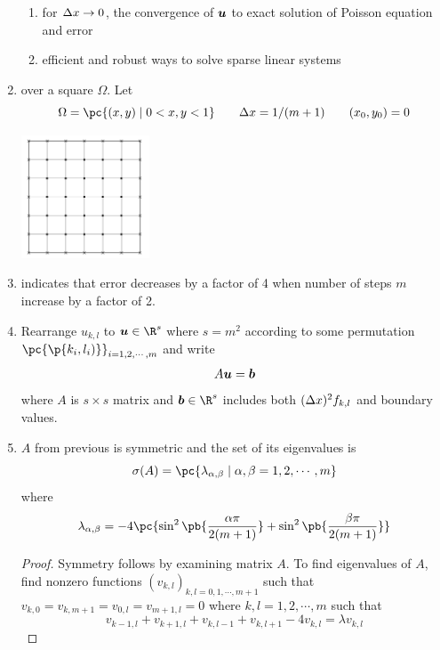 \documentclass[11pt]{article}
\begin{document}
\begin{enumerate}
\begin{enumerate}
        \item for $\Delta x \to 0$, the convergence of $\bm{u}$ to exact solution of Poisson equation and error
        \item efficient and robust ways to solve sparse linear systems
    \end{enumerate}
    \item {} over a square $\Omega$. Let 
    \[
        \Omega = \pc{(x,y) \mid 0 < x,y < 1}    
        \quad \quad
        \Dx = 1/(m+1)
        \quad \quad
        (x_0, y_0) = 0
    \]
    \begin{center}
        \includegraphics[width=0.3\textwidth]{simplified_grid}
    \end{center}
    \item {} indicates that error decreases by a factor of 4 when number of steps $m$ increase by a factor of 2.
    \item {} Rearrange $u_{k,l}$ to $\bu \in \R^s$ where $s=m^2$ according to some permutation $\pc{\p{k_i, l_i)}}_{i=1,2,\cdots,m}$ and write 
    \[
        A \bm{u} = \bm{b}    
    \]
    where $A$ is $s\times s$ matrix and $\bb \in\R^s$ includes both $(\Delta x)^2 f_{k,l}$ and boundary values.
    \item {} $A$ from previous is symmetric and the set of its eigenvalues is 
    \[
        \sigma(A) = \pc{
            \lambda_{\alpha,\beta} \mid \alpha,\beta = 1,2,\cdots,m
        }
    \]
    where 
    \[
        \lambda_{\alpha,\beta} = -4\pc{
            \sin^2 \pb{
                \frac{\alpha\pi}{2(m+1)}
            } + 
            \sin^2 \pb{
                \frac{\beta\pi}{2(m+1)}
            }
        }
    \]
    \begin{proof}
        Symmetry follows by examining matrix $A$. To find eigenvalues of $A$, find nonzero functions $(v_{k,l})_{k,l=0,1,\cdots,m+1}$ such that $v_{k,0} = v_{k,m+1}= v_{0,l} = v_{m+1,l} = 0$ where $k,l=1,2,\cdots, m$ such that 
        \[
            v_{k-1,l} + v_{k+1,l} + v_{k,l-1} + v_{k,l+1} - 4v_{k,l}  = \lambda v_{k,l}
\]
\end{proof}
\end{enumerate}
\end{document}
